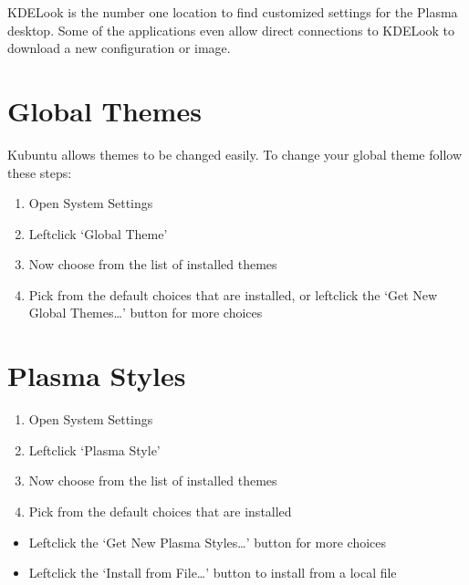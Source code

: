 \documentclass[letterpaper,10pt,english]{sphinxmanual}
\begin{document}
\sphinxAtStartPar
KDE\sphinxhyphen{}Look is the number one location to find customized settings for the  Plasma desktop. Some of the applications even allow direct connections to KDE\sphinxhyphen{}Look to download a new configuration or image.


\section{Global Themes}
\label{\detokenize{docs/advanced:global-themes}}
\sphinxAtStartPar
Kubuntu allows themes to be changed easily. To change your global theme follow these steps:
\begin{enumerate}
%
\item {} 
\sphinxAtStartPar
Open System Settings

\item {} 
\sphinxAtStartPar
Left\sphinxhyphen{}click ‘Global Theme’

\item {} 
\sphinxAtStartPar
Now choose from the list of installed themes

\item {} 
\sphinxAtStartPar
Pick from the default choices that are installed, or left\sphinxhyphen{}click the ‘Get New Global Themes…’ button for more choices

\end{enumerate}


\section{Plasma Styles}
\label{\detokenize{docs/advanced:plasma-styles}}\begin{enumerate}
%
\item {} 
\sphinxAtStartPar
Open System Settings

\item {} 
\sphinxAtStartPar
Left\sphinxhyphen{}click ‘Plasma Style’

\item {} 
\sphinxAtStartPar
Now choose from the list of installed themes

\item {} 
\sphinxAtStartPar
Pick from the default choices that are installed

\end{enumerate}
\begin{itemize}
\item {} 
\sphinxAtStartPar
Left\sphinxhyphen{}click the ‘Get New Plasma Styles…’ button for more choices

\item {} 
\sphinxAtStartPar
Left\sphinxhyphen{}click the ‘Install from File…’ button to install from a local file

\end{itemize}
\end{document}
